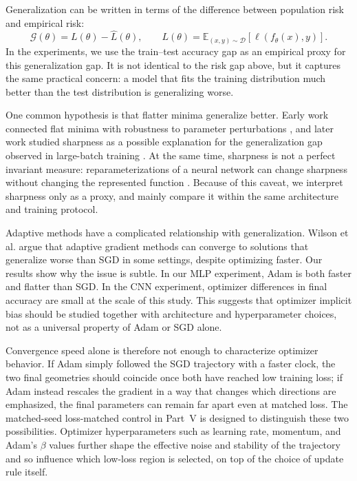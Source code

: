 \documentclass[11pt]{article}
\begin{document}
Generalization can be written in terms of the difference between population risk and empirical risk:
\[
\mathcal{G}(\theta)
= L(\theta)-\widehat L(\theta),
\qquad
L(\theta)=\mathbb{E}_{(x,y)\sim \mathcal{D}}
[\ell(f_\theta(x),y)].
\]
In the experiments, we use the train--test accuracy gap as an empirical proxy for this generalization gap. It is not identical to the risk gap above, but it captures the same practical concern: a model that fits the training distribution much better than the test distribution is generalizing worse.

One common hypothesis is that flatter minima generalize better. Early work connected flat minima with robustness to parameter perturbations \cite{hochreiter1997flat}, and later work studied sharpness as a possible explanation for the generalization gap observed in large-batch training \cite{keskar2017large}. At the same time, sharpness is not a perfect invariant measure: reparameterizations of a neural network can change sharpness without changing the represented function \cite{dinh2017sharp}. Because of this caveat, we interpret sharpness only as a proxy, and mainly compare it within the same architecture and training protocol.

Adaptive methods have a complicated relationship with generalization. Wilson et al. \cite{wilson2017marginal} argue that adaptive gradient methods can converge to solutions that generalize worse than SGD in some settings, despite optimizing faster. Our results show why the issue is subtle. In our MLP experiment, Adam is both faster and flatter than SGD. In the CNN experiment, optimizer differences in final accuracy are small at the scale of this study. This suggests that optimizer implicit bias should be studied together with architecture and hyperparameter choices, not as a universal property of Adam or SGD alone.

Convergence speed alone is therefore not enough to characterize optimizer behavior. If Adam simply followed the SGD trajectory with a faster clock, the two final geometries should coincide once both have reached low training loss; if Adam instead rescales the gradient in a way that changes which directions are emphasized, the final parameters can remain far apart even at matched loss. The matched-seed loss-matched control in Part~V is designed to distinguish these two possibilities. Optimizer hyperparameters such as learning rate, momentum, and Adam's $\beta$ values further shape the effective noise and stability of the trajectory and so influence which low-loss region is selected, on top of the choice of update rule itself.
\end{document}
